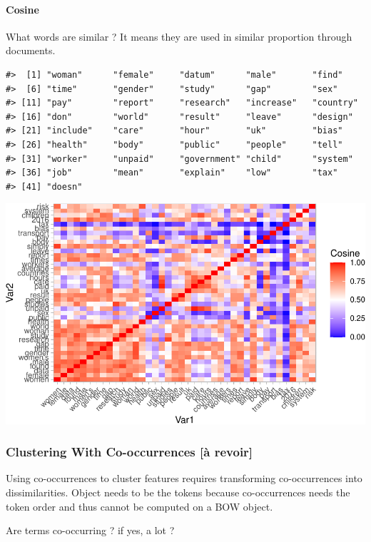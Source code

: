 \documentclass[
]{article}
\begin{document}
\hypertarget{cosine-1}{%
\paragraph{Cosine}\label{cosine-1}}

What words are similar ? It means they are used in similar proportion
through documents.

\begin{verbatim}
#>  [1] "woman"      "female"     "datum"      "male"       "find"      
#>  [6] "time"       "gender"     "study"      "gap"        "sex"       
#> [11] "pay"        "report"     "research"   "increase"   "country"   
#> [16] "don"        "world"      "result"     "leave"      "design"    
#> [21] "include"    "care"       "hour"       "uk"         "bias"      
#> [26] "health"     "body"       "public"     "people"     "tell"      
#> [31] "worker"     "unpaid"     "government" "child"      "system"    
#> [36] "job"        "mean"       "explain"    "low"        "tax"       
#> [41] "doesn"
\end{verbatim}

\begin{center}\includegraphics[width=0.7\linewidth]{report_files/figure-latex/euclidean similarities btwn words-1} \end{center}

\hypertarget{clustering-with-co-occurrences-uxe0-revoir}{%
\subsubsection{Clustering With Co-occurrences {[}à
revoir{]}}\label{clustering-with-co-occurrences-uxe0-revoir}}

Using co-occurrences to cluster features requires transforming
co-occurrences into dissimilarities. Object needs to be the tokens
because co-occurrences needs the token order and thus cannot be computed
on a BOW object.

Are terms co-occurring ? if yes, a lot ?
\end{document}
